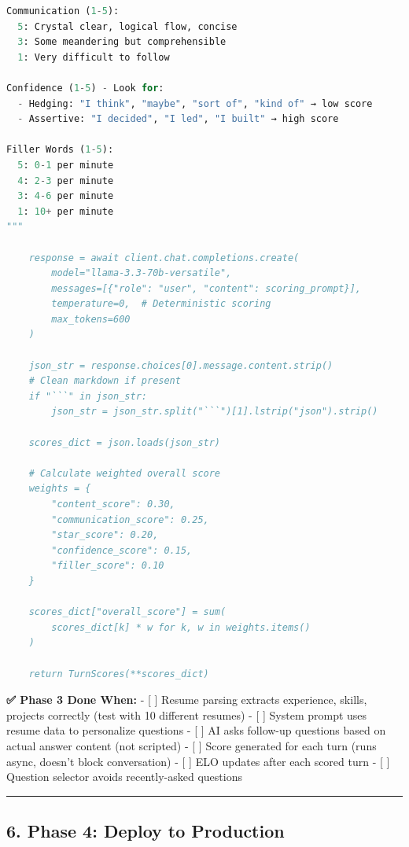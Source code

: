 \documentclass[
  11pt,
]{article}
\begin{document}
\begin{lstlisting}[language=Python]
Communication (1-5):
  5: Crystal clear, logical flow, concise
  3: Some meandering but comprehensible
  1: Very difficult to follow

Confidence (1-5) - Look for: 
  - Hedging: "I think", "maybe", "sort of", "kind of" → low score
  - Assertive: "I decided", "I led", "I built" → high score

Filler Words (1-5):
  5: 0-1 per minute
  4: 2-3 per minute
  3: 4-6 per minute
  1: 10+ per minute
"""
    
    response = await client.chat.completions.create(
        model="llama-3.3-70b-versatile",
        messages=[{"role": "user", "content": scoring_prompt}],
        temperature=0,  # Deterministic scoring
        max_tokens=600
    )
    
    json_str = response.choices[0].message.content.strip()
    # Clean markdown if present
    if "```" in json_str:
        json_str = json_str.split("```")[1].lstrip("json").strip()
    
    scores_dict = json.loads(json_str)
    
    # Calculate weighted overall score
    weights = {
        "content_score": 0.30,
        "communication_score": 0.25,
        "star_score": 0.20,
        "confidence_score": 0.15,
        "filler_score": 0.10
    }
    
    scores_dict["overall_score"] = sum(
        scores_dict[k] * w for k, w in weights.items()
    )
    
    return TurnScores(**scores_dict)
\end{lstlisting}

\textbf{✅ Phase 3 Done When:} - {[} {]} Resume parsing extracts
experience, skills, projects correctly (test with 10 different resumes)
- {[} {]} System prompt uses resume data to personalize questions - {[}
{]} AI asks follow-up questions based on actual answer content (not
scripted) - {[} {]} Score generated for each turn (runs async, doesn't
block conversation) - {[} {]} ELO updates after each scored turn - {[}
{]} Question selector avoids recently-asked questions

\begin{center}\rule{0.5\linewidth}{0.5pt}\end{center}

\hypertarget{phase-4-deploy-to-production}{%
\subsection{6. Phase 4: Deploy to
Production}\label{phase-4-deploy-to-production}}
\end{document}
